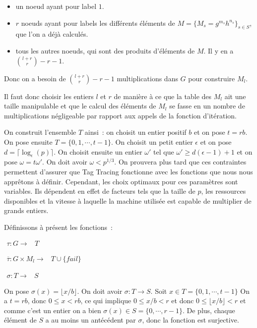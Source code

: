     \begin{itemize}
      \item un noeud ayant pour label $1$.
      \item $r$ noeuds ayant pour labels les différents éléments de $M = \{M_s = g^{m_s} h^{n_s}\}_{s \in S}$, que l'on a déjà calculés.
      \item tous les autres noeuds, qui sont des produits d'éléments de $M$. Il y en a $\binom{l+r}{r} - r - 1$.
    \end{itemize}

    Donc on a besoin de $\binom{l+r}{r} - r - 1$ multiplications dans $G$ pour construire $M_l$.

    Il faut donc choisir les entiers $l$ et $r$ de manière à ce que la table des $M_l$ ait une taille manipulable et que le calcul des éléments de $M_l$ se fasse en un nombre de multiplications négligeable par rapport aux appels de la fonction d'itération.

    On construit l'ensemble $T$ ainsi~: on choisit un entier positif $b$ et on pose $t = rb$. On pose ensuite $T = \{0,1,\cdots,t-1\}$. On choisit un petit entier $\epsilon$ et on pose $d = \lceil\log_\epsilon(p)\rceil$. On choisit ensuite un entier $\omega'$ tel que $\omega' \ge d(\epsilon - 1) + 1$ et on pose $\omega = t\omega'$. On doit avoir $\omega < p^{1/3}$. On prouvera plus tard que ces contraintes permettent d'assurer que Tag Tracing fonctionne avec les fonctions que nous nous apprêtons à définir. Cependant, les choix optimaux pour ces paramètres sont variables. Ils dépendent en effet de facteurs tels que la taille de $p$, les ressources disponibles et la vitesse à laquelle la machine utilisée est capable de multiplier de grands entiers.

    Définissons à présent les fonctions~:

    $\begin{array}{lrcl}
      \tau : G \longrightarrow & T
    \end{array}$

    $\begin{array}{lrcl}
      \overline{\tau} : G \times M_l \longrightarrow & T \cup \{fail\}
    \end{array}$

    $\begin{array}{lrcl}
      \sigma : T \longrightarrow & S
    \end{array}$

    On pose $\sigma(x) = \lfloor x/b \rfloor$. On doit avoir $\sigma : T \longrightarrow S$. Soit $x \in T = \{0,1,\cdots,t-1\}$ On a $t = rb$, donc $0 \leq x < rb$, ce qui implique $0 \leq x/b < r$ et donc $0 \leq \lfloor x/b \rfloor < r$ et comme c'est un entier on a bien $\sigma(x) \in S=\{0,\cdots,r-1\}$. De plus, chaque élément de $S$ a au moins un antécédent par $\sigma$, donc la fonction est surjective.

